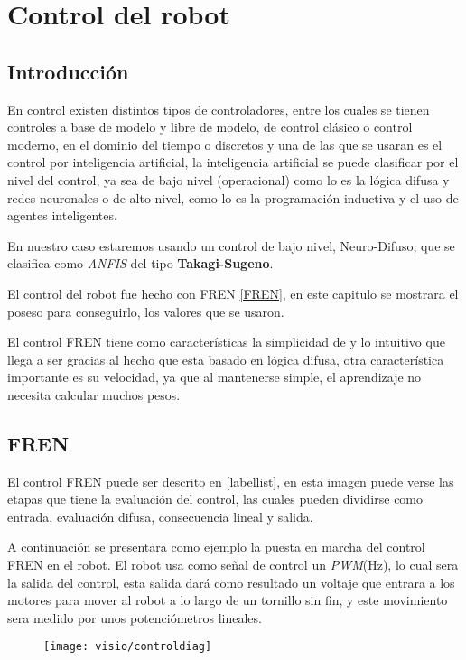 
    \chapter{Control del robot}
    \section{Introducción}
    En control existen distintos tipos de controladores, entre los cuales se tienen controles a base de modelo y libre de modelo, de control clásico o control moderno, en el dominio del tiempo o discretos y una de las que se usaran es el control por inteligencia artificial, la inteligencia artificial se puede clasificar por el nivel del control, ya sea de bajo nivel (operacional) como lo es la lógica difusa y redes neuronales o de alto nivel, como lo es la programación inductiva y el uso de agentes inteligentes.
    
    En nuestro caso estaremos usando un control de bajo nivel, Neuro-Difuso, que se clasifica como \textit{ANFIS} del tipo \textbf{Takagi-Sugeno}.
        
    El control del robot fue hecho con FREN \ref{FREN}, en este capitulo se mostrara el poseso para conseguirlo, los valores que se usaron.
    
    El control FREN tiene como características la simplicidad de y lo intuitivo que llega a ser gracias al hecho que esta basado en lógica difusa, otra característica importante es su velocidad, ya que al mantenerse simple, el aprendizaje no necesita calcular muchos pesos.




    \section{FREN}	
    El control FREN puede ser descrito en \cref{labellist}, en esta imagen puede verse las etapas que tiene la evaluación del control,  las cuales pueden dividirse como entrada, evaluación difusa, consecuencia lineal y salida.
    
    
    A continuación se presentara como ejemplo la puesta en marcha del control FREN en el robot.
    El robot usa como señal de control un \textit{PWM}(Hz), lo cual sera la salida del control, esta salida dará como resultado un voltaje que entrara a los motores para mover al robot a lo largo de un tornillo sin fin, y este movimiento sera medido por unos potenciómetros lineales.
    
    
\begin{figure}[h]
	\centering
	\texttt{[image: visio/controldiag]}
	\caption{}
	\label{fig:controldiag}
\end{figure}


